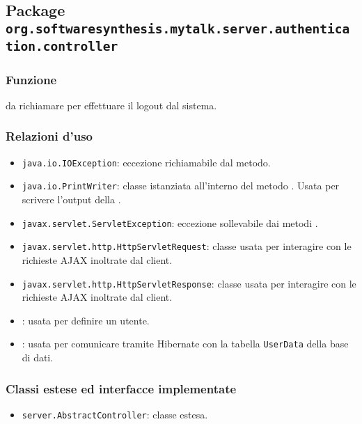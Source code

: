 \subsection{Package \texttt{org.softwaresynthesis.mytalk.server.authentication.controller}}\label{sec:autservlet}


\subsubsection*{Funzione}
 da richiamare per effettuare il logout dal sistema.

\subsubsection*{Relazioni d'uso}
\begin{itemize}
	\item \texttt{java.io.IOException}: eccezione richiamabile dal metodo.
	\item \texttt{java.io.PrintWriter}: classe istanziata all'interno del metodo . Usata per scrivere l'output della .
	\item \texttt{javax.servlet.ServletException}: eccezione sollevabile dai metodi .
	\item \texttt{javax.servlet.http.HttpServletRequest}: classe usata per interagire con le richieste AJAX inoltrate dal client.
	\item \texttt{javax.servlet.http.HttpServletResponse}: classe usata per interagire con le richieste AJAX inoltrate dal client.
	\item {}: usata per definire un utente.
	\item {}: usata per comunicare tramite Hibernate con la tabella \texttt{UserData} della base di dati.
\end{itemize}

\subsubsection*{Classi estese ed interfacce implementate}
\begin{itemize}
	\item \texttt{server.AbstractController}: classe estesa.
\end{itemize}

